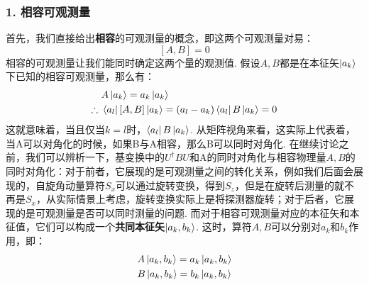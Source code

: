 \subsubsection{1. 相容可观测量}
首先，我们直接给出\textbf{相容}的可观测量的概念，即这两个可观测量对易：
\[
[A,B] = 0
\]
相容的可观测量让我们能同时确定这两个量的观测值. 假设\(A,B\)都是在本征矢\(\ket{a_{k}}\)下已知的相容可观测量，那么有：
\begin{align*}
& A\ket{a_{k}} = a_{k}\ket{a_{k}} \\
\therefore\ 
& \bra{a_{l}}[A,B]\ket{a_{k}} = (a_{l} - a_{k})\bra{a_{l}}B\ket{a_{k}} = 0
\end{align*}
这就意味着，当且仅当\(k=l\)时，\(\bra{a_{l}}B\ket{a_{k}}\). 从矩阵视角来看，这实际上代表着，当A可以对角化的时候，如果B与A相容，那么B可以同时对角化. 在继续讨论之前，我们可以辨析一下，基变换中的\(U^{\dagger}BU\)和A的同时对角化与相容物理量\(A,B\)的同时对角化：对于前者，它展现的是可观测量之间的转化关系，例如我们后面会展现的，自旋角动量算符\(S_{x}\)可以通过旋转变换，得到\(S_{z}\)，但是在旋转后测量的就不再是\(S_{x}\)，从实际情景上考虑，旋转变换实际上是将探测器旋转；对于后者，它展现的是可观测量是否可以同时测量的问题. 而对于相容可观测量对应的本征矢和本征值，它们可以构成一个\textbf{共同本征矢}\(\ket{a_{k},b_{k}}\). 这时，算符\(A,B\)可以分别对\(a_{k}\)和\(b_{k}\)作用，即：
\begin{align*}
& A\ket{a_{k},b_{k}} = a_{k}\ket{a_{k},b_{k}} \\
& B\ket{a_{k},b_{k}} = b_{k}\ket{a_{k},b_{k}}
\end{align*}
